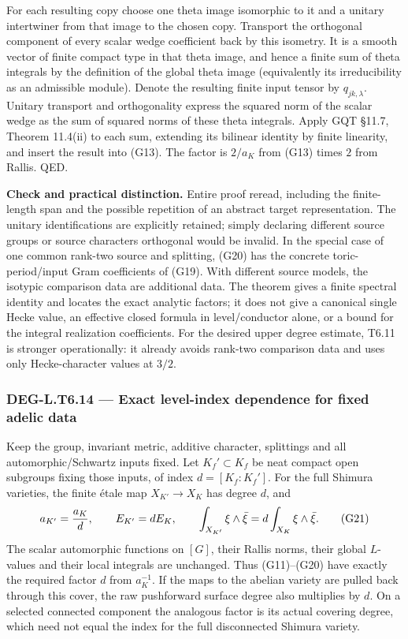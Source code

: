 For each resulting copy choose one theta image isomorphic to it and a unitary intertwiner from that image to the chosen copy. Transport the orthogonal component of every scalar wedge coefficient back by this isometry. It is a smooth vector of finite compact type in that theta image, and hence a finite sum of theta integrals by the definition of the global theta image (equivalently its irreducibility as an admissible module). Denote the resulting finite input tensor by \(q_{jk,\lambda}\). Unitary transport and orthogonality express the squared norm of the scalar wedge as the sum of squared norms of these theta integrals. Apply GQT §11.7, Theorem 11.4(ii) to each sum, extending its bilinear identity by finite linearity, and insert the result into (G13). The factor is \(2/a_K\) from (G13) times \(2\) from Rallis. QED.

\textbf{Check and practical distinction.} Entire proof reread, including the finite-length span and the possible repetition of an abstract target representation. The unitary identifications are explicitly retained; simply declaring different source groups or source characters orthogonal would be invalid. In the special case of one common rank-two source and splitting, (G20) has the concrete toric-period/input Gram coefficients of (G19). With different source models, the isotypic comparison data are additional data. The theorem gives a finite spectral identity and locates the exact analytic factors; it does not give a canonical single Hecke value, an effective closed formula in level/conductor alone, or a bound for the integral realization coefficients. For the desired upper degree estimate, T6.11 is stronger operationally: it already avoids rank-two comparison data and uses only Hecke-character values at \(3/2\).

\subsubsection{DEG-L.T6.14 --- Exact level-index dependence for fixed adelic data}\label{DEG-L.T6.14}

Keep the group, invariant metric, additive character, splittings and all automorphic/Schwartz inputs fixed. Let \(K_f'\subset K_f\) be neat compact open subgroups fixing those inputs, of index \(d=[K_f:K_f']\). For the full Shimura varieties, the finite étale map \(X_{K'}\to X_K\) has degree \(d\), and \[
a_{K'}={a_K\over d},\qquad
E_{K'}=dE_K,\qquad
\int_{X_{K'}}\xi\wedge\bar\xi
=d\int_{X_K}\xi\wedge\bar\xi.
\tag{G21}
\] The scalar automorphic functions on \([G]\), their Rallis norms, their global \(L\)-values and their local integrals are unchanged. Thus (G11)--(G20) have exactly the required factor \(d\) from \(a_K^{-1}\). If the maps to the abelian variety are pulled back through this cover, the raw pushforward surface degree also multiplies by \(d\). On a selected connected component the analogous factor is its actual covering degree, which need not equal the index for the full disconnected Shimura variety.


